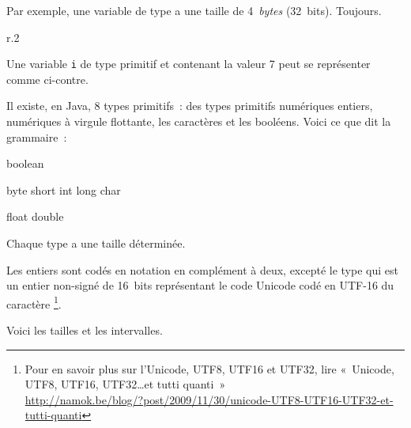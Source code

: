 	Par exemple, une variable de type  a une taille de
	4~\textit{bytes} (32~bits). Toujours.
	
	\begin{wrapfigure}{r}{.2\linewidth}
	\end{wrapfigure}

	Une variable \texttt{i} de type primitif et contenant la valeur 7 peut se
	représenter comme ci-contre. 
	
	Il existe, en Java, 8 types primitifs~: des types primitifs numériques
	entiers, numériques à virgule flottante, les  caractères et les booléens.
	Voici ce que dit la grammaire~: 
	
	\begin{grammaire}
		    boolean


		    byte short int long char

		    float double
	\end{grammaire}
	
	Chaque type a une taille déterminée. 
	
	Les entiers sont codés en notation en
	complément à deux, excepté le type  qui est un entier non-signé de
	16~bits représentant le code Unicode codé en UTF-16 du caractère
	\footnote{%
		Pour en savoir plus sur l'Unicode, UTF8, UTF16 et UTF32, lire
		«~Unicode, UTF8, UTF16, UTF32\ldots et tutti quanti~»
		\\\url{http://namok.be/blog/?post/2009/11/30/unicode-UTF8-UTF16-UTF32-et-tutti-quanti}
	}. 
	
	Voici les tailles et les intervalles. 

